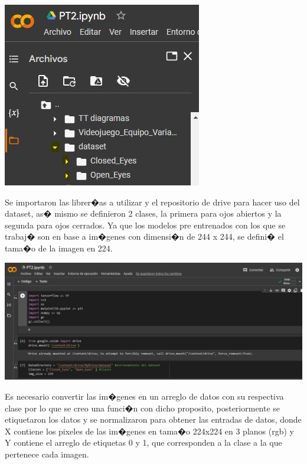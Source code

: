 \documentclass[12pt,letterpaper]{article}
\begin{document}
\begin{center}
  \includegraphics[scale=0.7]{imagenes/dv}
 \label{fig:DataGC} 
\end{center} 



Se importaron las librer�as a utilizar y el repositorio de drive para hacer uso del dataset, as� mismo se definieron 2 clases, la primera para ojos abiertos y la segunda para ojos cerrados. 
Ya que los modelos pre entrenados con los que se trabaj� son en base a im�genes con dimensi�n de 244 x 244, se defini� el tama�o de la imagen en 224.


\begin{center}
  \includegraphics[scale=0.4]{imagenes/librerias.JPG}
 \label{fig:Librerias} 
\end{center} 


Es necesario convertir las im�genes en un arreglo de datos con su respectiva clase por lo que se creo una funci�n con dicho proposito, posteriormente se etiquetaron los datos y se normalizaron para obtener las entradas de datos, donde X contiene los pixeles de las im�genes en tama�o 224x224 en 3 planos (rgb) y Y contiene el arreglo de etiquetas 0 y 1, que corresponden a la clase a la que pertenece cada imagen. 
\end{document}
